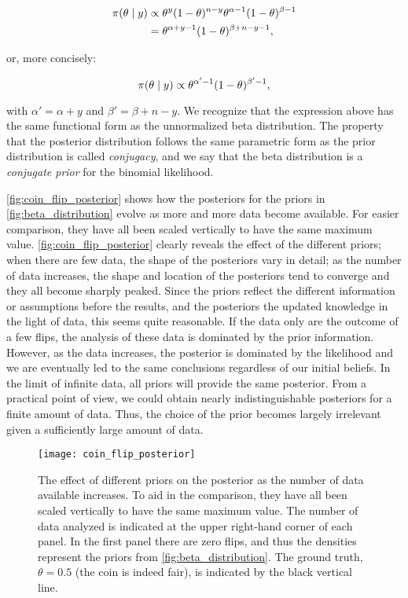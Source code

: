 \begin{align*}
    \pi \qty(\theta \mid y) &\propto \theta^y (1-\theta)^{n-y} \theta^{\alpha-1}(1-\theta)^{\beta -1} \\
    &= \theta^{\alpha + y -1} (1-\theta)^{\beta + n-y -1},
\end{align*}

or, more concisely:

\begin{equation}\label{eq:coin_posterior}
    \pi \qty(\theta \mid y) \propto \theta^{\alpha' -1} (1-\theta)^{\beta' -1},
\end{equation}

with $\alpha'=\alpha+y$ and $\beta' = \beta + n - y$. We recognize that the expression above has the same functional form as the unnormalized beta distribution. The property that the posterior distribution follows the same parametric form as the prior distribution is called \textit{conjugacy}, and we say that the beta distribution is a \textit{conjugate prior} for the binomial likelihood.  

\autoref{fig:coin_flip_posterior} shows how the posteriors for the priors in \autoref{fig:beta_distribution} evolve as more and more data become available. For easier comparison, they have all been scaled vertically to have the same maximum value. \autoref{fig:coin_flip_posterior} clearly reveals the effect of the different priors; when there are few data, the shape of the posteriors vary in detail; as the number of data increases, the shape and location of the posteriors tend to converge and they all become sharply peaked. Since the priors reflect the different information or assumptions before the results, and the posteriors the updated knowledge in the light of data, this seems quite reasonable. If the data only are the outcome of a few flips, the analysis of these data is dominated by the prior information. However, as the data increases, the posterior is dominated by the likelihood and we are eventually led to the same conclusions regardless of our initial beliefs. In the limit of infinite data, all priors will provide the same posterior. From a practical point of view, we could obtain nearly indistinguishable posteriors for a finite amount of data. Thus, the choice of the prior becomes largely irrelevant given a sufficiently large amount of data.

\begin{figure}[H]
    \centering
    \texttt{[image: coin\_flip\_posterior]}
    \caption{The effect of different priors on the posterior as the number of data available increases. To aid in the comparison, they have all been scaled vertically to have the same maximum value. The number of data analyzed is indicated at the upper right-hand corner of each panel. In the first panel there are zero flips, and thus the densities represent the priors from \autoref{fig:beta_distribution}. The ground truth, $\theta=0.5$ (the coin is indeed fair), is indicated by the black vertical line. 
    }
    \label{fig:coin_flip_posterior}
\end{figure} 

